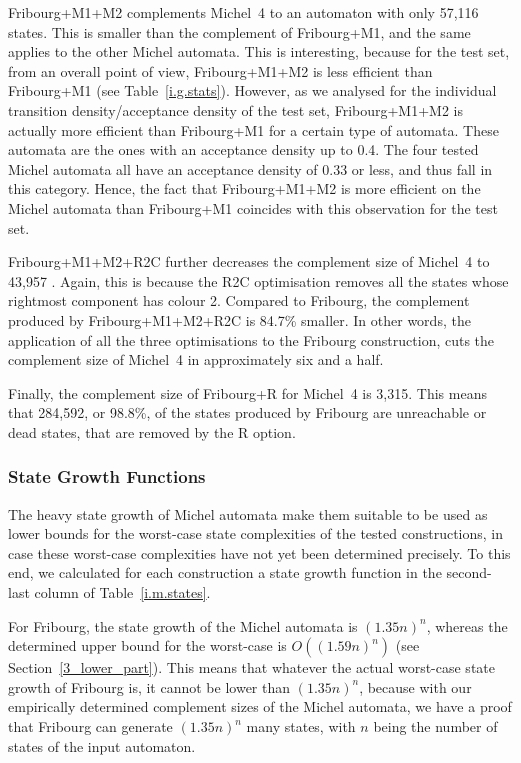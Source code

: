 Fribourg+M1+M2 complements Michel~4 to an automaton with only 57,116 states. This is smaller than the complement of Fribourg+M1, and the same applies to the other Michel automata. This is interesting, because for the \goal{} test set,  from an overall point of view, Fribourg+M1+M2 is less efficient than Fribourg+M1 (see Table~\ref{i.g.stats}). However, as we analysed for the individual transition density/acceptance density of the \goal{} test set, Fribourg+M1+M2 is actually more efficient than Fribourg+M1 for a certain type of automata. These automata are the ones with an acceptance density up to 0.4. The four tested Michel automata all have an acceptance density of 0.33 or less, and thus fall in this category. Hence, the fact that Fribourg+M1+M2 is more efficient on the Michel automata than Fribourg+M1 coincides with this observation for the \goal{} test set.

Fribourg+M1+M2+R2C further decreases the complement size of Michel~4 to 43,957
. Again, this is because the R2C optimisation removes all the states whose rightmost component has colour 2. Compared to Fribourg, the complement produced by Fribourg+M1+M2+R2C is 84.7\% smaller. In other words, the application of all the three optimisations to the Fribourg construction, cuts the complement size of Michel~4 in approximately six and a half.

Finally, the complement size of Fribourg+R for Michel~4 is 3,315. This means that 284,592, or 98.8\%, of the states produced by Fribourg are unreachable or dead states, that are removed by the R option.

\subsubsection{State Growth Functions}

The heavy state growth of Michel automata make them suitable to be used as lower bounds for the worst-case state complexities of the tested constructions, in case these worst-case complexities have not yet been determined precisely. To this end, we calculated for each construction a state growth function in the second-last column of Table~\ref{i.m.states}.

For Fribourg, the state growth of the Michel automata is $(1.35n)^n$, whereas the determined upper bound for the worst-case is $O((1.59n)^n)$ (see Section~\ref{3_lower_part}). This means that whatever the actual worst-case state growth of Fribourg is, it cannot be lower than $(1.35n)^n$, because with our empirically determined complement sizes of the Michel automata, we have a proof that Fribourg can generate $(1.35n)^n$ many states, with $n$ being the number of states of the input automaton.


